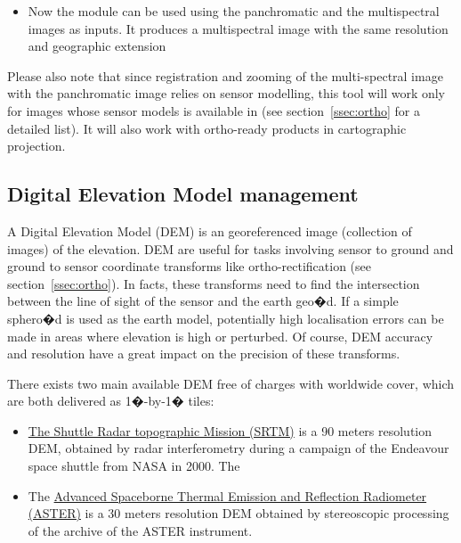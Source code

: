 \begin{itemize}
\item Now the  module can be used using the panchromatic and the multispectral images as inputs. It produces a multispectral image with the same resolution and geographic extension %


\end{itemize}


Please also note that since registration and zooming of the
multi-spectral image with the panchromatic image relies on sensor
modelling, this tool will work only for images whose sensor models is
available in \otb (see section~\ref{ssec:ortho} for a detailed
list). It will also work with ortho-ready products in cartographic
projection.

\subsection{Digital Elevation Model management}\label{ssec:dem}

A Digital Elevation Model (DEM) is an georeferenced image (collection
of images) of the elevation. DEM are useful for tasks involving sensor
to ground and ground to sensor coordinate transforms like
ortho-rectification (see section~\ref{ssec:ortho}). In facts, these
transforms need to find the intersection between the line of sight of
the sensor and the earth geo�d. If a simple sphero�d is used as the
earth model, potentially high localisation errors can be made in areas
where elevation is high or perturbed. Of course, DEM accuracy and
resolution have a great impact on the precision of these transforms.

There exists two main available DEM free of charges with worldwide
cover, which are both delivered as  1�-by-1� tiles:
\begin{itemize}
\item \href{http://www2.jpl.nasa.gov/srtm/}{The Shuttle Radar
  topographic Mission (SRTM)} is a 90 meters resolution DEM, obtained
  by radar interferometry during a campaign of the Endeavour space
  shuttle from NASA in 2000. The 
\item The \href{http://www.ersdac.or.jp/GDEM/E/2.html}{Advanced
  Spaceborne Thermal Emission and Reflection Radiometer (ASTER)} is a
  30 meters resolution DEM obtained by stereoscopic processing of the
  archive of the ASTER instrument.
\end{itemize}

